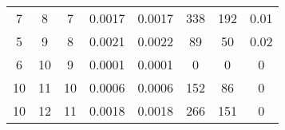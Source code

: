\begin{table}[]
\begin{tabular}{@{}cccccccc@{}}
7                                                         & 8                                                           & 7                                                    & 0.0017                                                                           & 0.0017                                                                          & 338                                                                             & 192                                                                                  & 0.01                                                                       \\
5                                                         & 9                                                           & 8                                                    & 0.0021                                                                           & 0.0022                                                                          & 89                                                                              & 50                                                                                   & 0.02                                                                       \\
6                                                         & 10                                                          & 9                                                    & 0.0001                                                                           & 0.0001                                                                          & 0                                                                               & 0                                                                                    & 0                                                                          \\
10                                                        & 11                                                          & 10                                                   & 0.0006                                                                           & 0.0006                                                                          & 152                                                                             & 86                                                                                   & 0                                                                          \\
10                                                        & 12                                                          & 11                                                   & 0.0018                                                                           & 0.0018                                                                          & 266                                                                             & 151                                                                                  & 0                                                                          \\

\end{tabular}
\end{table}
